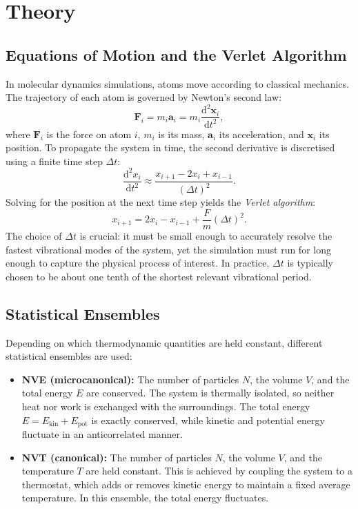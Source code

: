 \documentclass[a4paper,12pt]{scrartcl}
\begin{document}
\section{Theory}

\subsection{Equations of Motion and the Verlet Algorithm}
In molecular dynamics simulations, atoms move according to classical mechanics. The trajectory of each atom is governed by Newton's second law:
\begin{equation}
    \mathbf{F}_i = m_i \mathbf{a}_i = m_i \frac{\mathrm{d}^2 \mathbf{x}_i}{\mathrm{d}t^2},
\end{equation}
where $\mathbf{F}_i$ is the force on atom $i$, $m_i$ is its mass, $\mathbf{a}_i$ its acceleration, and $\mathbf{x}_i$ its position. To propagate the system in time, the second derivative is discretised using a finite time step $\Delta t$:
\begin{equation}
    \frac{\mathrm{d}^2 x_i}{\mathrm{d}t^2} \approx \frac{x_{i+1} - 2x_i + x_{i-1}}{(\Delta t)^2}.
\end{equation}
Solving for the position at the next time step yields the \emph{Verlet algorithm}:
\begin{equation}
    x_{i+1} = 2x_i - x_{i-1} + \frac{F}{m}(\Delta t)^2.
\end{equation}
The choice of $\Delta t$ is crucial: it must be small enough to accurately resolve the fastest vibrational modes of the system, yet the simulation must run for long enough to capture the physical process of interest. In practice, $\Delta t$ is typically chosen to be about one tenth of the shortest relevant vibrational period.

\subsection{Statistical Ensembles}
Depending on which thermodynamic quantities are held constant, different statistical ensembles are used:
\begin{itemize}
    \item \textbf{NVE (microcanonical):} The number of particles $N$, the volume $V$, and the total energy $E$ are conserved. The system is thermally isolated, so neither heat nor work is exchanged with the surroundings. The total energy $E = E_\mathrm{kin} + E_\mathrm{pot}$ is exactly conserved, while kinetic and potential energy fluctuate in an anticorrelated manner.
    \item \textbf{NVT (canonical):} The number of particles $N$, the volume $V$, and the temperature $T$ are held constant. This is achieved by coupling the system to a thermostat, which adds or removes kinetic energy to maintain a fixed average temperature. In this ensemble, the total energy fluctuates.
\end{itemize}
\end{document}
